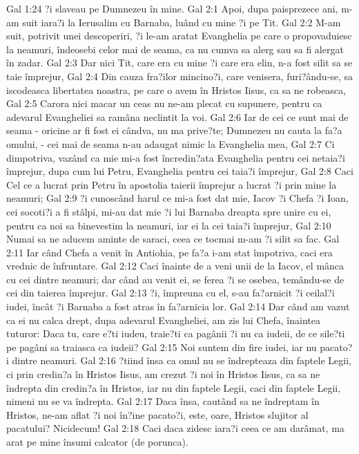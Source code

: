Gal 1:24  ?i slaveau pe Dumnezeu în mine.
Gal 2:1  Apoi, dupa paisprezece ani, m-am suit iara?i la Ierusalim cu Barnaba, luând cu mine ?i pe Tit.
Gal 2:2  M-am suit, potrivit unei descoperiri, ?i le-am aratat Evanghelia pe care o propovaduiesc la neamuri, îndeosebi celor mai de seama, ca nu cumva sa alerg sau sa fi alergat în zadar.
Gal 2:3  Dar nici Tit, care era cu mine ?i care era elin, n-a fost silit sa se taie împrejur,
Gal 2:4  Din cauza fra?ilor mincino?i, care venisera, furi?ându-se, sa iscodeasca libertatea noastra, pe care o avem în Hristos Iisus, ca sa ne robeasca,
Gal 2:5  Carora nici macar un ceas nu ne-am plecat cu supunere, pentru ca adevarul Evangheliei sa ramâna neclintit la voi.
Gal 2:6  Iar de cei ce sunt mai de seama - oricine ar fi fost ei cândva, nu ma prive?te; Dumnezeu nu cauta la fa?a omului, - cei mai de seama n-au adaugat nimic la Evanghelia mea,
Gal 2:7  Ci dimpotriva, vazând ca mie mi-a fost încredin?ata Evanghelia pentru cei netaia?i împrejur, dupa cum lui Petru, Evanghelia pentru cei taia?i împrejur,
Gal 2:8  Caci Cel ce a lucrat prin Petru în apostolia taierii împrejur a lucrat ?i prin mine la neamuri;
Gal 2:9  ?i cunoscând harul ce mi-a fost dat mie, Iacov ?i Chefa ?i Ioan, cei socoti?i a fi stâlpi, mi-au dat mie ?i lui Barnaba dreapta spre unire cu ei, pentru ca noi sa binevestim la neamuri, iar ei la cei taia?i împrejur,
Gal 2:10  Numai sa ne aducem aminte de saraci, ceea ce tocmai m-am ?i silit sa fac.
Gal 2:11  Iar când Chefa a venit în Antiohia, pe fa?a i-am stat împotriva, caci era vrednic de înfruntare.
Gal 2:12  Caci înainte de a veni unii de la Iacov, el mânca cu cei dintre neamuri; dar când au venit ei, se ferea ?i se osebea, temându-se de cei din taierea împrejur.
Gal 2:13  ?i, împreuna cu el, s-au fa?arnicit ?i ceilal?i iudei, încât ?i Barnaba a fost atras în fa?arnicia lor.
Gal 2:14  Dar când am vazut ca ei nu calca drept, dupa adevarul Evangheliei, am zis lui Chefa, înaintea tuturor: Daca tu, care e?ti iudeu, traie?ti ca pagânii ?i nu ca iudeii, de ce sile?ti pe pagâni sa traiasca ca iudeii?
Gal 2:15  Noi suntem din fire iudei, iar nu pacato?i dintre neamuri.
Gal 2:16  ?tiind însa ca omul nu se îndrepteaza din faptele Legii, ci prin credin?a în Hristos Iisus, am crezut ?i noi în Hristos Iisus, ca sa ne îndrepta din credin?a în Hristos, iar nu din faptele Legii, caci din faptele Legii, nimeni nu se va îndrepta.
Gal 2:17  Daca însa, cautând sa ne îndreptam în Hristos, ne-am aflat ?i noi în?ine pacato?i, este, oare, Hristos slujitor al pacatului? Nicidecum!
Gal 2:18  Caci daca zidesc iara?i ceea ce am darâmat, ma arat pe mine însumi calcator (de porunca).
